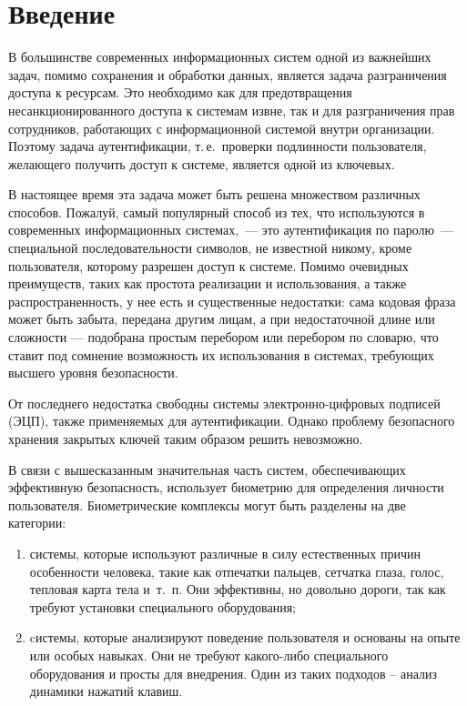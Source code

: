             \vspace*{-5pt}



      \thispagestyle{headings}

      \begin{multicols}{2}

            \label{st\stat}
            

            
\section{Введение}

В большинстве современных информационных систем одной из важнейших
задач, помимо сохранения и обработки данных, является задача
разграничения доступа к ресурсам. Это необходимо как для
предотвращения несанкционированного доступа к сис\-те\-мам извне, так и
для разграничения прав сотрудников, работающих с информационной
сис\-те\-мой внутри организации. Поэтому задача аутентификации, т.\,е.\
проверки подлинности пользователя, желающего получить доступ к
системе, является одной из ключевых.

В настоящее время эта задача может быть решена множеством различных
способов. Пожалуй, самый популярный способ из тех, что используются
в современных информационных системах,~--- это аутентификация по
паролю~--- специальной последовательности символов, не известной
никому, кроме пользователя, которому разрешен доступ к системе.
Помимо очевидных преимуществ, таких как простота реализации и
использования, а также распространенность, у нее есть и существенные
недостатки: сама кодовая фраза может быть забыта, передана другим
лицам, а при недостаточной длине или сложности --- подобрана простым
перебором или перебором по словарю, что ставит под сомнение
возможность их использования в системах, требующих высшего уровня
безопасности.

От последнего недостатка свободны системы электронно-цифровых
подписей (ЭЦП), также применяемых для аутентификации. Однако
проб\-ле\-му безопасного хранения закрытых ключей таким образом решить
невозможно.

В связи с вышесказанным значительная часть систем, обеспечивающих
эффективную безопасность, использует биометрию для определения
личности пользователя. Биометрические комплексы могут быть разделены
на две категории:
\begin{enumerate}[(1)]
    \item системы, которые используют различные в силу естественных причин особенности 
    человека, такие как отпечатки пальцев, сетчатка глаза, голос, тепловая карта тела 
    и~т.~п. Они эффективны, но довольно дороги, так как требуют установки специального оборудования;
    \item cистемы, которые анализируют поведение пользователя и основаны на 
    опыте или особых навыках. Они не требуют какого-либо специального оборудования и 
    просты для внедрения. Один из таких подходов -- анализ динамики нажатий клавиш.
\end{enumerate}


\end{multicols}
